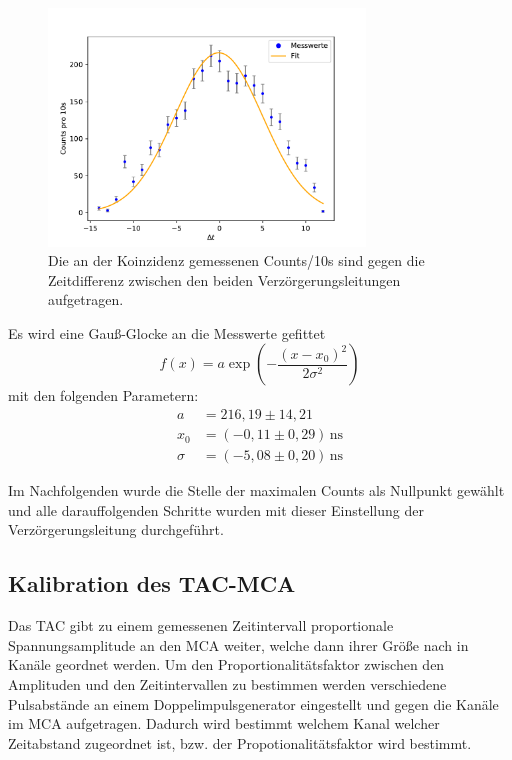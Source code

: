         \begin{figure}[h]
            \centering
            \includegraphics[width = 0.75\textwidth]{plots/Verzoergerung.pdf}
            \caption{Die an der Koinzidenz gemessenen Counts/10s sind gegen die Zeitdifferenz zwischen den beiden Verzörgerungsleitungen aufgetragen.}
            \label{fig:Verzoergerung}
        \end{figure}

        \FloatBarrier

        Es wird eine Gauß-Glocke an die Messwerte gefittet
        \begin{equation*}
            f(x) = a \exp\left(-\frac{\left(x - x_0\right)^2}{2 \sigma^2}\right)
        \end{equation*}
        mit den folgenden Parametern:
        \begin{align*}
            a &= 216,19 \pm 14,21 \\
            x_0 &= (-0,11 \pm 0,29) \, \text{ns} \\
            \sigma &= (-5,08 \pm 0,20) \, \text{ns}
        \end{align*}

        Im Nachfolgenden wurde die Stelle der maximalen Counts als Nullpunkt gewählt und alle darauffolgenden Schritte wurden mit dieser Einstellung der Verzörgerungsleitung durchgeführt.

        \newpage
        \subsection{Kalibration des TAC-MCA}
        Das TAC gibt zu einem gemessenen Zeitintervall proportionale Spannungsamplitude an den MCA weiter, welche dann ihrer Größe nach in Kanäle geordnet werden. Um den Proportionalitätsfaktor zwischen den Amplituden und den Zeitintervallen zu bestimmen werden verschiedene Pulsabstände an einem Doppelimpulsgenerator eingestellt und gegen die Kanäle im MCA aufgetragen. Dadurch wird bestimmt welchem Kanal welcher Zeitabstand zugeordnet ist, bzw. der Propotionalitätsfaktor wird bestimmt.

